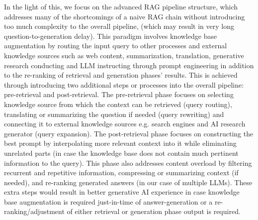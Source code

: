 In the light of this, we focus on the advanced RAG pipeline structure, which addresses many of the shortcomings of a naive RAG chain without introducing too much complexity to the overall pipeline, (which may result in very long question-to-generation delay).
This paradigm involves knowledge base augmentation by routing the input query to other processes and external knowledge sources such as web content, summarization, translation, generative research conducting and LLM instructing through prompt engineering in addition to the re-ranking of retrieval and generation phases' results. This is achieved through introducing two additional steps or processes into the overall pipeline: pre-retrieval and post-retrieval. The pre-retrieval phase focuses on selecting knowledge source from which the context can be retrieved (query routing), translating or summarizing the question if needed (query rewriting) and connecting it to external knowledge sources e.g. search engines and AI research generator (query expansion). The post-retrieval phase focuses on constructing the best prompt by interpolating more relevant context into it while eliminating unrelated parts (in case the knowledge base does not contain much pertinent information to the query). This phase also addresses content overload by filtering recurrent and repetitive information, compressing or summarizing context (if needed), and re-ranking generated answers (in our case of multiple LLMs).\newline
These extra steps would result in better generative AI experience in case knowledge base augmentation is required just-in-time of answer-generation or a re-ranking/adjustment of either retrieval or generation phase output is required.
\newpage

